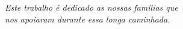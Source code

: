 \begin{dedicatoria}
   \vspace*{\fill}
   \centering
   \noindent
   \textit{ Este trabalho é dedicado as nossas famílias que\\
   nos apoiaram durante essa longa caminhada.} \vspace*{\fill}
\end{dedicatoria}